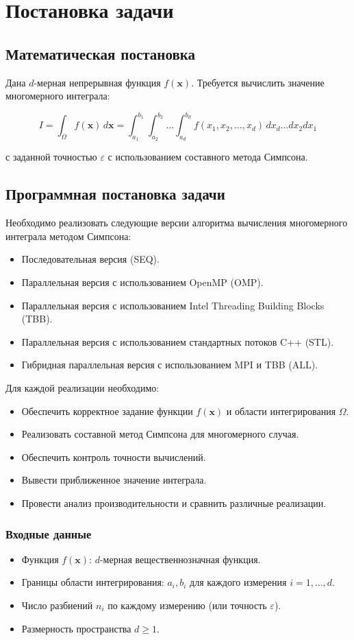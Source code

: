 \documentclass[12pt]{article}
\begin{document}
\newpage
\section{Постановка задачи}
\subsection{Математическая постановка}
Дана $d$-мерная непрерывная функция $f(\mathbf{x})$. Требуется вычислить значение многомерного интеграла:

\[
I = \int_{\Omega} f(\mathbf{x}) \, d\mathbf{x} = \int_{a_1}^{b_1} \int_{a_2}^{b_2} \dots \int_{a_d}^{b_d} f(x_1, x_2, \dots, x_d) \, dx_d \dots dx_2 dx_1
\]

с заданной точностью $\varepsilon$ с использованием составного метода Симпсона.

\subsection{Программная постановка задачи}
Необходимо реализовать следующие версии алгоритма вычисления многомерного интеграла методом Симпсона:
\begin{itemize}
    \item Последовательная версия (SEQ).
    \item Параллельная версия с использованием OpenMP (OMP).
    \item Параллельная версия с использованием Intel Threading Building Blocks (TBB).
    \item Параллельная версия с использованием стандартных потоков C++ (STL).
    \item Гибридная параллельная версия с использованием MPI и TBB (ALL).
\end{itemize}

Для каждой реализации необходимо:
\begin{itemize}
    \item Обеспечить корректное задание функции $f(\mathbf{x})$ и области интегрирования $\Omega$.
    \item Реализовать составной метод Симпсона для многомерного случая.
    \item Обеспечить контроль точности вычислений.
    \item Вывести приближенное значение интеграла.
    \item Провести анализ производительности и сравнить различные реализации.
\end{itemize}

\subsubsection{Входные данные}
\begin{itemize}
    \item Функция $f(\mathbf{x})$: $d$-мерная вещественнозначная функция.
    \item Границы области интегрирования: $a_i, b_i$ для каждого измерения $i = 1, \dots, d$.
    \item Число разбиений $n_i$ по каждому измерению (или точность $\varepsilon$).
    \item Размерность пространства $d \geq 1$.
\end{itemize}
\end{document}
